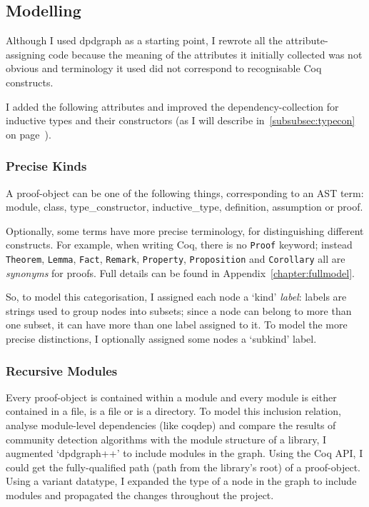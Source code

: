 \subsection{Modelling}\label{subsec:modelling}

Although I used dpdgraph as a starting point, I rewrote all the
attribute-assigning code because the meaning of the attributes it initially
collected was not obvious and terminology it used did not correspond to
recognisable Coq constructs.

I added the following attributes and improved the dependency-collection for
inductive types and their constructors (as I will describe
in~\ref{subsubsec:typecon}~ on
page~\pageref{subsubsec:typecon}).

\subsubsection{Precise Kinds}\label{subsubsec:kinds}

A proof-object can be one of the following things, corresponding to an AST term:
\textsf{module}, \textsf{class}, \textsf{type\_constructor},
\textsf{inductive\_type}, \textsf{definition}, \textsf{assumption} or
\textsf{proof}.

Optionally, some terms have more precise terminology, for distinguishing
different constructs. For example, when writing Coq, there is no \texttt{Proof}
keyword; instead \texttt{Theorem}, \texttt{Lemma}, \texttt{Fact},
\texttt{Remark}, \texttt{Property}, \texttt{Proposition} and \texttt{Corollary}
all are \emph{synonyms} for proofs. Full details can be found in
Appendix~\ref{chapter:fullmodel}.

So, to model this categorisation, I assigned each node a `kind' \emph{label}:
labels are strings used to group nodes into subsets; since a node can belong to
more than one subset, it can have more than one label assigned to it. To model
the more precise distinctions, I optionally assigned some nodes a `subkind'
label.

\subsubsection{Recursive Modules}\label{subsubsec:recmodules}

Every proof-object is contained within a module and every module is either
contained in a file, is a file or is a directory. To model this inclusion
relation, analyse module-level dependencies (like coqdep) and compare the
results of community detection algorithms with the module structure of a
library, I augmented `dpdgraph++' to include modules in the graph. Using the
Coq API, I could get the fully-qualified path (path from the library's root) of
a proof-object. Using a variant datatype, I expanded the type of a node in the
graph to include modules and propagated the changes throughout the project.

